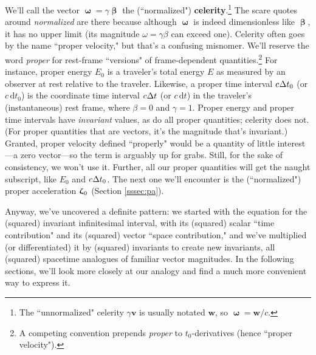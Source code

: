 \documentclass[12pt]{article}
\renewcommand{\vv}[1]{\mathbf{#1}}
\newcommand{\dd}[1]{\mathrm{d}#1}
\newcommand{\vvbeta}{\bm{\upbeta}}
\newcommand{\vvomega}{\bm{\upomega}}
\newcommand{\vvzeta}{\bm{\upzeta}}
\begin{document}
We'll call the vector $\vvomega = \gamma \vvbeta$ the (``normalized") \textbf{celerity}.\footnote{The ``unnormalized" celerity $\gamma \vv v$ is usually notated $\vv w$, so $\vvomega = \vv w / c$.} The scare quotes around \emph{normalized} are there because although $\vvomega$ is indeed dimensionless like $\vvbeta$, it has no upper limit (its magnitude $\omega = \gamma \beta$ can exceed one). Celerity often goes by the name ``proper velocity," but that's a confusing misnomer. We'll reserve the word \emph{proper} for rest-frame ``versions" of frame-dependent quantities.\footnote{\label{fn:pr}A competing convention prepends \emph{proper} to $t_0$-derivatives (hence ``proper velocity").} For instance, proper energy $E_0$ is a traveler's total energy $E$ as measured by an observer at rest relative to the traveler. Likewise, a proper time interval $c \mkern.5mu \Delta t_0$ (or $c \, \dd t_0$) is the coordinate time interval $c \mkern.5mu \Delta t$ (or $c \, \dd t$) in the traveler's (instantaneous) rest frame, where $\beta = 0$ and $\gamma = 1$. Proper energy and proper time intervals have \emph{invariant} values, as do all proper quantities; celerity does not. (For proper quantities that are vectors, it's the magnitude that's invariant.) Granted, proper velocity defined ``properly" would be a quantity of little interest---a zero vector---so the term is arguably up for grabs. Still, for the sake of consistency, we won't use it. Further, all our proper quantities will get the naught subscript, like $E_0$ and $c \mkern.5mu \Delta t_0$. The next one we'll encounter is the (``normalized") proper acceleration $\vvzeta_{\mkern1mu 0}$ (Section \ref{sssec:pa}).

Anyway, we've uncovered a definite pattern: we started with the equation for the (squared) invariant infinitesimal interval, with its (squared) scalar ``time contribution" and its (squared) vector ``space contribution," and we've multiplied (or differentiated) it by (squared) invariants to create new invariants, all (squared) spacetime analogues of familiar vector magnitudes. In the following sections, we'll look more closely at our analogy and find a much more convenient way to express it.


\clearpage
\end{document}
